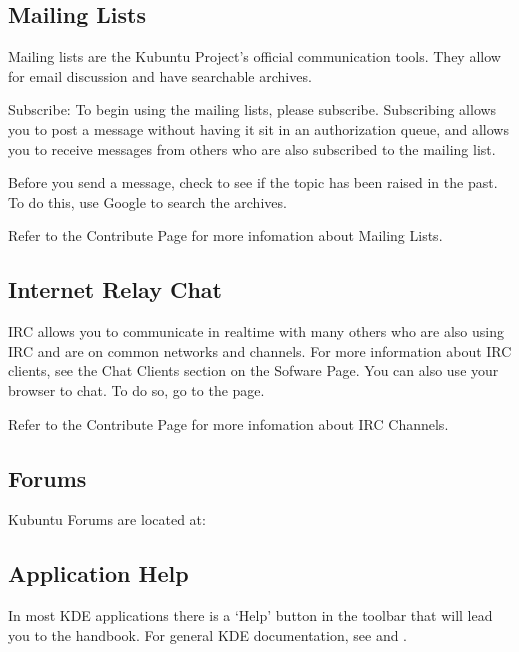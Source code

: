 \documentclass[letterpaper,10pt,english]{sphinxmanual}
\begin{document}
\subsection{Mailing Lists}
\label{\detokenize{docs/support:mailing-lists}}
\sphinxAtStartPar
Mailing lists are the Kubuntu Project’s official communication tools. They allow for email discussion and have searchable archives.

\sphinxAtStartPar
Subscribe:
To begin using the mailing lists, please subscribe. Subscribing allows you to post a message without having it sit in an authorization queue, and allows you to receive messages from others who are also subscribed to the mailing list.

\sphinxAtStartPar
Before you send a message, check to see if the topic has been raised in the past. To do this, use Google to search the archives.

\sphinxAtStartPar
Refer to the Contribute Page for more infomation about Mailing Lists.


\subsection{Internet Relay Chat}
\label{\detokenize{docs/support:internet-relay-chat}}
\sphinxAtStartPar
IRC allows you to communicate in real\sphinxhyphen{}time with many others who are also using IRC and are on common networks and channels. For more information about IRC clients, see the Chat Clients section on the Sofware Page. You can also use your browser to chat. To do so, go to the  page.

\sphinxAtStartPar
Refer to the Contribute Page for more infomation about IRC Channels.


\subsection{Forums}
\label{\detokenize{docs/support:forums}}
\sphinxAtStartPar
Kubuntu Forums are located at: 


\subsection{Application Help}
\label{\detokenize{docs/support:application-help}}
\sphinxAtStartPar
In most KDE applications there is a ‘Help’ button in the toolbar that will lead you to the handbook. For general KDE documentation, see  and .
\end{document}
